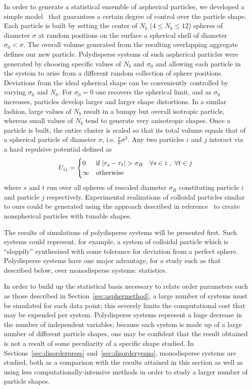 {In order to generate a  statistical ensemble of aspherical particles, we developed a simple model~\cite{disorder1} that guarantees a certain degree of control over
the particle shape. Each particle is built by setting the center of $N_b$ ($4 \leq N_b \leq 12$) spheres of diameter $\sigma$ at random 
positions on the surface a spherical shell of diameter $\sigma_0<\sigma$.
The overall volume generated from the resulting overlapping aggregate defines our new particle.
Polydisperse systems of such aspherical particles were generated by choosing specific values of $N_b$ and $\sigma_0$ and allowing each particle in the system to arise from a different random collection of sphere positions.
Deviations from the ideal spherical shape can be conveniently controlled by varying $\sigma_0$ and $N_b$.
For  $\sigma_0=0$ one recovers the spherical limit, and as  $\sigma_0$ increases, particles develop larger and larger shape distortions.
In a similar fashion, large values of $N_b$ result in a bumpy but overall isotropic particle, whereas small values of $N_b$ tend to generate very anisotropic shapes.
Once a particle is built, the entire cluster is scaled so that its total volume equals that of a spherical particle of diameter $\sigma$, i.e. $\frac{\pi}{6}\sigma^3$.
Any two particles $i$ and $j$ interact via a hard repulsive potential defined as
\begin{equation}
U_{ij}=
	\begin{cases}
		0 & {\textrm{if }} |r_s-r_t|>\sigma_R \,\,\,\,\,\,\forall s\in i \,\,,\,\, \forall t\in j \cr
		\infty &\text{otherwise}\cr
	\end{cases}
\end{equation}
where $s$ and $t$ run over all spheres of rescaled diameter $\sigma_R$ constituting particle $i$ and particle $j$ respectively.
Experimental realizations of colloidal particles similar to ours could be generated using the approach described in reference~\cite{weitz,pine,mitragotri} 
to create nonspherical particles with tunable shapes. }

The results of simulations of polydisperse systems will be presented first.
Such systems could represent, for example, a system of colloidal particle which is ``sloppily'' synthesized with some tolerance for deviation from a perfect sphere.
Polydisperse systems have one major advantage, for a study such as that described below, over monodisperse systems: statistics.

In order to build up the statistical basis necessary to relate order parameters such as those described in Section~\ref{sec:asphermethod}, a large number of systems must be simulated for each data point; this severely limits the computational cost that may be expended per system.
Polydisperse systems represent a huge decrease in the number of independent variables; because each system is made up of a large number of different particle shapes, one may be confident that the result obtained is not a result of some peculiarity of a specific shape studied.
In Sections~\ref{sec:disorderpress} and~\ref{sec:disorderyesno}, monodisperse systems are studied, both as a comparison with the results attained in this section as well as using less computationally-intensive methods in order to study a larger number of particle shapes.

